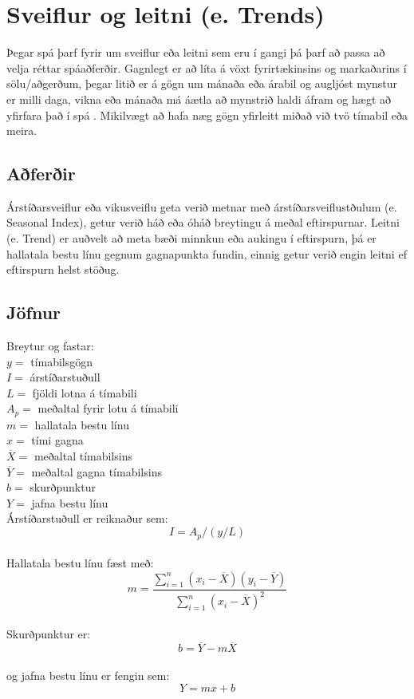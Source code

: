 \section {Sveiflur og leitni (e. Trends)}

Þegar spá þarf fyrir um sveiflur eða leitni sem eru í gangi þá þarf að passa að velja réttar spáaðferðir. Gagnlegt er að líta á vöxt fyrirtækinsins og markaðarins í sölu/aðgerðum, þegar litið er á gögn um mánaða eða árabil og augljóst mynstur er milli daga, vikna eða mánaða má áætla að mynstrið haldi áfram og hægt að yfirfara það í spá \cite{WhatIsTrendForecasting} . Mikilvægt að hafa næg gögn yfirleitt miðað við tvö tímabil eða meira.

\subsection{Aðferðir}
Árstíðarsveiflur eða vikusveiflu geta verið metnar með árstíðarsveiflustðulum (e. Seasonal Index), getur verið háð eða óháð breytingu á meðal eftirspurnar.\cite{TrendLine} Leitni (e. Trend)  er auðvelt að meta bæði minnkun eða aukingu í eftirspurn, þá er hallatala bestu línu gegnum gagnapunkta fundin, einnig getur verið engin leitni ef eftirspurn helst stöðug.


\subsection{Jöfnur}

Breytur og fastar:\\
	$y=$ tímabilsgögn \\
	$I=$ árstíðarstuðull \\
	$L=$ fjöldi lotna á tímabili \\
	$A_p=$ meðaltal fyrir lotu á tímabili \\
	$m=$ hallatala bestu línu \\
	$x=$ tími gagna \\
	$\overline{X} = $ meðaltal tímabilsins \\
	$\overline{Y}= $ meðaltal gagna tímabilsins \\
	$ b= $ skurðpunktur \\
	$ Y= $ jafna bestu línu \\

\noindent Árstíðarstuðull er reiknaður sem:
	$$ I=  A_p/(y/L) $$ \\

\noindent Hallatala bestu línu fæst með:
	$$ m= \frac{\sum_{i=1}^{n} (x_{i}-\overline{X})(y_{i}-\overline{Y})}{\sum_{i=1}^{n} (x_{i}-\overline{X})^{2}} $$ \\

\noindent Skurðpunktur er:
	$$ b=  \overline {Y} -m\overline{X} $$ \\

\noindent og jafna bestu línu er fengin sem:
	$$ Y=  mx+b $$ \\